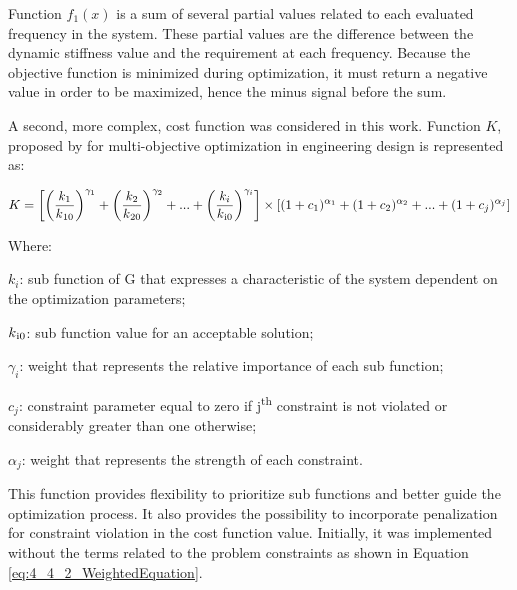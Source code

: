 Function $f_1(x)$ is a sum of several partial values related to each evaluated frequency in the system. These partial values are the difference between the dynamic stiffness value and the requirement at each frequency. Because the objective function is minimized during optimization, it must return a negative value in order to be maximized, hence the minus signal before the sum.

A second, more complex, cost function was considered in this work. Function $K$, proposed by  for multi-objective optimization in engineering design is represented as:

\begin{equation}
\label{eq:4_4_2_AnderssonEquation}
K = \left[\left( \frac{k_1}{k\textsubscript{10}} \right)^{\gamma_1} +
		  \left( \frac{k_2}{k\textsubscript{20}} \right)^{\gamma_2} + ... + 
		  \left( \frac{k_i}{k\textsubscript{i0}} \right)^{\gamma_i} \right] \times
		 [(1+c_1)^{\alpha_1} + (1+c_2)^{\alpha_2} + ... + (1+c_j)^{\alpha_j}]
\end{equation}

Where:

\begin{description}
	\item \hspace{20pt}$k_i$: sub function of G that expresses a characteristic of the system dependent on the optimization parameters;
	\item \hspace{20pt}$k\textsubscript{i0}$: sub function value for an acceptable solution;
	\item \hspace{20pt}$\gamma_i$: weight that represents the relative importance of each sub function;
	\item \hspace{20pt}$c_j$: constraint parameter equal to zero if j\textsuperscript{th} constraint is not violated or considerably greater than one otherwise;
	\item \hspace{20pt}$\alpha_j$: weight that represents the strength of each constraint.
\end{description}

This function provides flexibility to prioritize sub functions and better guide the optimization process. It also provides the possibility to incorporate penalization for constraint violation in the cost function value. Initially, it was implemented without the terms related to the problem constraints as shown in Equation \ref{eq:4_4_2_WeightedEquation}.

